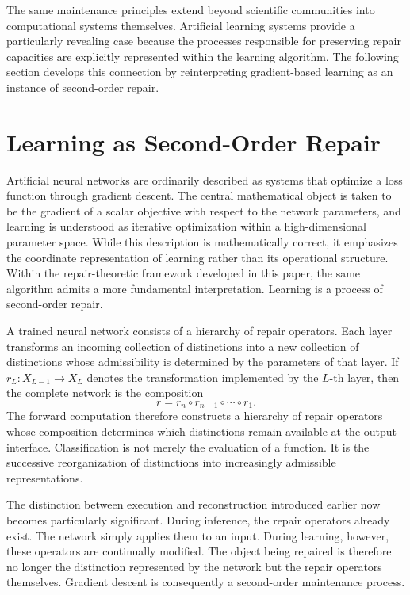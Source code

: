\documentclass[12pt,oneside]{article}
\theoremstyle{plain}
\theoremstyle{definition}
\theoremstyle{remark}
\theoremstyle{plain}
\begin{document}
The same maintenance principles extend beyond scientific communities into computational systems
themselves. Artificial learning systems provide a particularly revealing case because the processes
responsible for preserving repair capacities are explicitly represented within the learning
algorithm. The following section develops this connection by reinterpreting gradient-based learning
as an instance of second-order repair.

\section{Learning as Second-Order Repair}

Artificial neural networks are ordinarily described as systems that optimize a loss function
through gradient descent. The central mathematical object is taken to be the gradient of a scalar
objective with respect to the network parameters, and learning is understood as iterative
optimization within a high-dimensional parameter space. While this description is mathematically
correct, it emphasizes the coordinate representation of learning rather than its operational
structure. Within the repair-theoretic framework developed in this paper, the same algorithm admits
a more fundamental interpretation. Learning is a process of second-order repair.

A trained neural network consists of a hierarchy of repair operators. Each layer transforms an
incoming collection of distinctions into a new collection of distinctions whose admissibility is
determined by the parameters of that layer. If $r_L : X_{L-1} \rightarrow X_L$ denotes the
transformation implemented by the $L$-th layer, then the complete network is the composition
\[
r = r_n \circ r_{n-1} \circ \cdots \circ r_1.
\]
The forward computation therefore constructs a hierarchy of repair operators whose composition
determines which distinctions remain available at the output interface. Classification is not merely
the evaluation of a function. It is the successive reorganization of distinctions into increasingly
admissible representations.

The distinction between execution and reconstruction introduced earlier now becomes particularly
significant. During inference, the repair operators already exist. The network simply applies them
to an input. During learning, however, these operators are continually modified. The object being
repaired is therefore no longer the distinction represented by the network but the repair operators
themselves. Gradient descent is consequently a second-order maintenance process.
\end{document}
